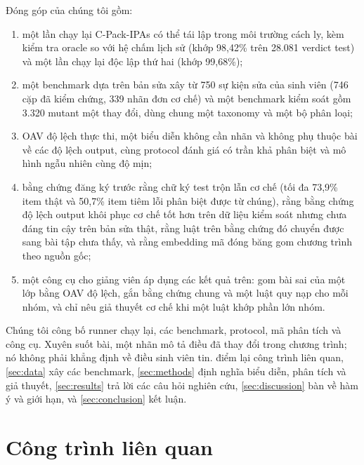 \documentclass[a4paper,preprint,12pt,authoryear]{elsarticle}
\begin{document}
Đóng góp của chúng tôi gồm:
\begin{enumerate}
\item một lần chạy lại C-Pack-IPAs có thể tái lập trong môi trường cách ly, kèm kiểm tra oracle so với hệ chấm lịch sử (khớp 98,42\% trên 28.081 verdict test) và một lần chạy lại độc lập thứ hai (khớp 99,68\%);
\item một benchmark dựa trên bản sửa xây từ 750 sự kiện sửa của sinh viên (746 cặp đã kiểm chứng, 339 nhãn đơn cơ chế) và một benchmark kiểm soát gồm 3.320 mutant một thay đổi, dùng chung một taxonomy và một bộ phân loại;
\item OAV độ lệch thực thi, một biểu diễn không cần nhãn và không phụ thuộc bài về các độ lệch output, cùng protocol đánh giá có trần khả phân biệt và mô hình ngẫu nhiên cùng độ mịn;
\item bằng chứng đăng ký trước rằng chữ ký test trộn lẫn cơ chế (tối đa 73,9\% item thật và 50,7\% item tiêm lỗi phân biệt được từ chúng), rằng bằng chứng độ lệch output khôi phục cơ chế tốt hơn trên dữ liệu kiểm soát nhưng chưa đáng tin cậy trên bản sửa thật, rằng luật trên bằng chứng đó chuyển được sang bài tập chưa thấy, và rằng embedding mã đóng băng gom chương trình theo nguồn gốc;
\item một công cụ cho giảng viên áp dụng các kết quả trên: gom bài sai của một lớp bằng OAV độ lệch, gắn bằng chứng chung và một luật quy nạp cho mỗi nhóm, và chỉ nêu giả thuyết cơ chế khi một luật khớp phần lớn nhóm.
\end{enumerate}
Chúng tôi công bố runner chạy lại, các benchmark, protocol, mã phân tích và công cụ. Xuyên suốt bài, một nhãn mô tả điều đã thay đổi trong chương trình; nó không phải khẳng định về điều sinh viên tin.  điểm lại công trình liên quan, \cref{sec:data} xây các benchmark, \cref{sec:methods} định nghĩa biểu diễn, phân tích và giả thuyết, \cref{sec:results} trả lời các câu hỏi nghiên cứu, \cref{sec:discussion} bàn về hàm ý và giới hạn, và \cref{sec:conclusion} kết luận.

\section{Công trình liên quan}\label{sec:related}
\end{document}
